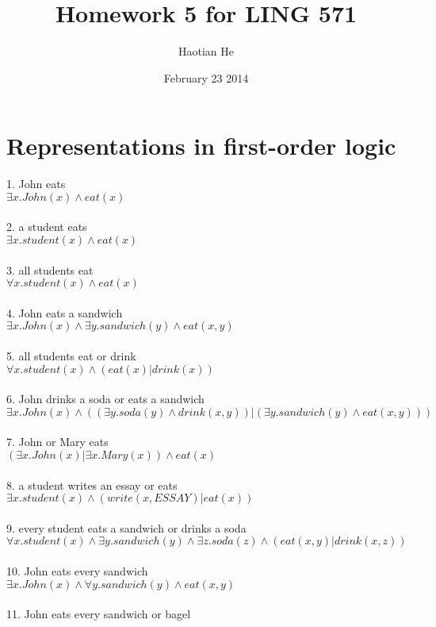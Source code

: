 \documentclass[11pt]{article}
\title{Homework 5 for LING 571}
\author{Haotian He}
\date{February 23 2014}
\begin{document}
\maketitle
\section{Representations in first-order logic}
1. John eats \\
$\exists x.John(x) \wedge eat(x)$ \\ \\
2. a student eats \\
$\exists x.student(x) \wedge eat(x)$ \\ \\
3. all students eat \\
$\forall x.student(x) \wedge eat(x)$ \\ \\
4. John eats a sandwich \\
$\exists x.John(x) \wedge \exists y.sandwich(y) \wedge eat(x,y)$ \\ \\
5. all students eat or drink \\
$\forall x.student(x) \wedge (eat(x) | drink(x))$ \\ \\
6. John drinks a soda or eats a sandwich \\
$\exists x.John(x) \wedge ((\exists y.soda(y) \wedge drink(x,y))|(\exists y.sandwich(y) \wedge eat(x,y)))$ \\ \\
7. John or Mary eats \\
$(\exists x.John(x) | \exists x.Mary(x)) \wedge eat(x)$ \\ \\
8. a student writes an essay or eats \\
$\exists x.student(x) \wedge (write(x,ESSAY) | eat(x))$ \\ \\
9. every student eats a sandwich or drinks a soda \\
$\forall x.student(x) \wedge \exists y.sandwich(y) \wedge \exists z.soda(z) \wedge (eat(x,y) | drink(x,z))$ \\ \\
10. John eats every sandwich \\
$\exists x.John(x) \wedge \forall y.sandwich(y) \wedge eat(x,y)$ \\ \\
11. John eats every sandwich or bagel \\
\end{document}
